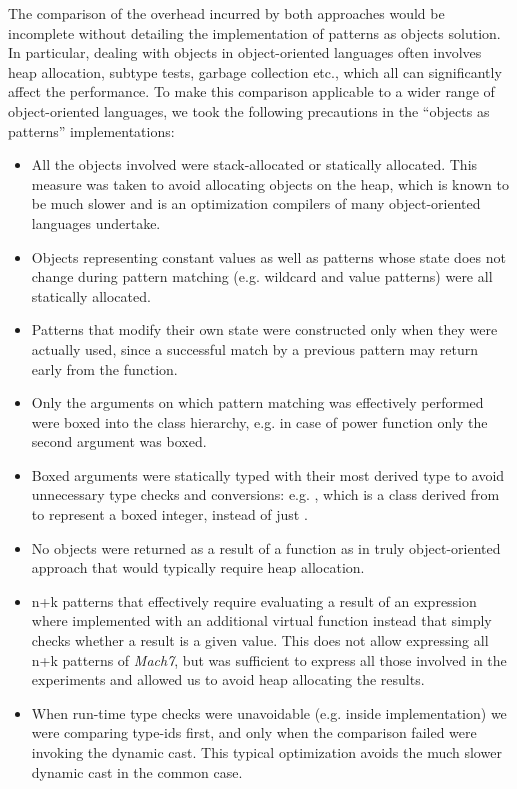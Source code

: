 The comparison of the overhead incurred by both approaches would be incomplete 
without detailing the implementation of patterns as objects solution. In particular, 
dealing with objects in object-oriented languages often involves heap allocation, 
subtype tests, garbage collection etc., which all can significantly affect the 
performance. To make this comparison applicable to a wider range of 
object-oriented languages, we took the following precautions in the 
``objects as patterns'' implementations:

\begin{itemize}
\setlength{\itemsep}{0pt}
\setlength{\parskip}{0pt}
\item All the objects involved were stack-allocated or statically allocated. 
      This measure was taken to avoid allocating objects on the heap, which is 
      known to be much slower and is an optimization compilers of many 
      object-oriented languages undertake.
\item Objects representing constant values as well as patterns whose state 
      does not change during pattern matching (e.g. wildcard and value patterns) 
      were all statically allocated.
\item Patterns that modify their own state were constructed only when they were 
      actually used, since a successful match by a previous pattern may return 
      early from the function.
\item Only the arguments on which pattern matching was effectively performed 
      were boxed into the  class hierarchy, e.g. in case of power 
      function only the second argument was boxed.
\item Boxed arguments were statically typed with their most derived type to 
      avoid unnecessary type checks and conversions: e.g. , 
      which is a class derived from  to represent a boxed integer, 
      instead of just .
\item No objects were returned as a result of a function as in truly 
      object-oriented approach that would typically require heap allocation.
\item n+k patterns that effectively require evaluating a result of an expression 
      where implemented with an additional virtual function instead that simply
      checks whether a result is a given value. This does not allow expressing
      all n+k patterns of \emph{Mach7}, but was sufficient to express all those 
      involved in the experiments and allowed us to avoid heap allocating the 
      results. 
\item When run-time type checks were unavoidable (e.g. inside  
      implementation) we were comparing type-ids first, and only when the 
      comparison failed were invoking the dynamic cast. This typical 
      optimization avoids the much slower dynamic cast in the common case.
\end{itemize}


